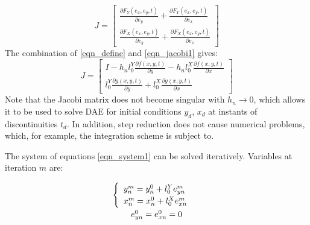 \documentclass[lettersize,journal]{IEEEtran}
\begin{document}
\begin{equation}
	\label{eqn_jacobi1}
	J = \begin{bmatrix}
		\frac{\partial F_Y(e_x, e_y, t)}{\partial e_y}  +  \frac{\partial F_Y(e_x, e_y, t)}{\partial e_x} \\
		\frac{\partial F_X(e_x, e_y, t)}{\partial e_y}  +  \frac{\partial F_X(e_x, e_y, t)}{\partial e_x}
	\end{bmatrix}
\end{equation}
The combination of \eqref{eqn_define} and \eqref{eqn_jacobi1} gives:
\begin{equation}
	\label{eqn_jacobi2}
	J = \begin{bmatrix}
		I - h_nl_0^Y\frac{\partial f(x, y, t)}{\partial y}  -  h_nl_0^X\frac{\partial f(x, y, t)}{\partial x} \\
		l_0^Y\frac{\partial g(x, y, t)}{\partial y} +  l_0^X\frac{\partial g(x, y, t)}{\partial x} 
	\end{bmatrix}
\end{equation}
Note that the Jacobi matrix does not become singular with \(h_n\rightarrow 0\), which allows it to be used to solve DAE for initial conditions \(y_d\), \(x_d\) at instants of discontinuities \(t_d\). In addition, step reduction does not cause numerical problems, which, for example, the integration scheme \cite{petzold82} is subject to.

The system of equations \eqref{eqn_system1} can be solved iteratively. Variables at iteration \(m\) are:

\begin{equation}
	\label{eqn_mitervars}
	\begin{array}{c}
		\def\arraystretch{1.3}
		\begin{array}{c}
			\begin{cases}
				\begin{array}{l}
					y_n^m =y_n^0+l_0^Ye_{yn}^m \\
					x_n^m =x_n^0+l_0^Xe_{xn}^m \\
				\end{array} \\
			\end{cases} \\
			e_{yn}^0=e_{xn}^0= 0 
		\end{array}
	\end{array}
\end{equation}
\end{document}

